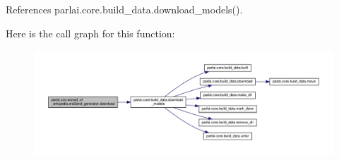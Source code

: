 References parlai.\+core.\+build\+\_\+data.\+download\+\_\+models().

Here is the call graph for this function\+:
\nopagebreak
\begin{figure}[H]
\begin{center}
\leavevmode
\includegraphics[width=350pt]{namespaceparlai_1_1zoo_1_1wizard__of__wikipedia_1_1end2end__generator_a3a34c992127ebe52eb1d98dcebbb4d47_cgraph}
\end{center}
\end{figure}
